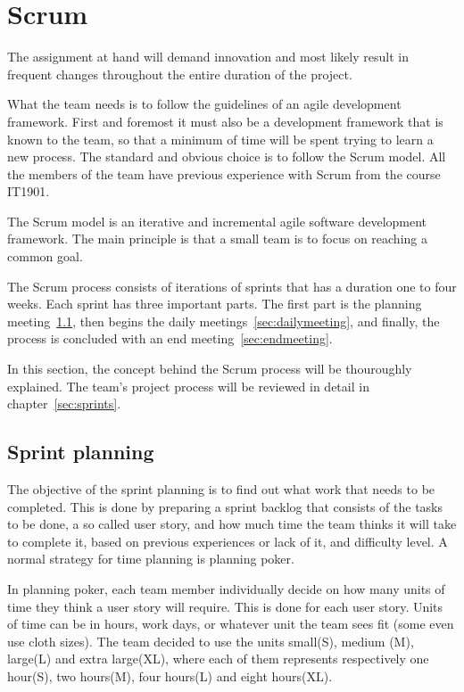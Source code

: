 \section{Scrum}

The assignment at hand will demand innovation and most likely result in frequent changes throughout the entire duration of the project.

What the team needs is to follow the guidelines of an agile development framework. First and foremost it must also be a development framework that is known to the team, so that a minimum of time will be spent trying to learn a new process. The standard and obvious choice is to follow the Scrum model. All the members of the team have previous experience with Scrum from the course IT1901.

The Scrum model is an iterative and incremental agile software development framework. The main principle is that a small team is to focus on reaching a common goal.

The Scrum process consists of iterations of sprints that has a duration one to four weeks. Each sprint has three important parts.
The first part is the planning meeting~\ref{sec:sprintplanning}, then begins the daily  meetings~\ref{sec:dailymeeting}, and finally, the process is concluded with an end meeting~\ref{sec:endmeeting}.

In this section, the concept behind the Scrum process will be thouroughly explained. The team's project process will be reviewed in detail in chapter~\ref{sec:sprints}.

\subsection{Sprint planning}
\label{sec:sprintplanning}
The objective of the sprint planning is to find out what work that needs to be completed. This is done by preparing a sprint backlog that consists of the tasks to be done, a so called user story, and how much time the team thinks it will take to complete it, based on previous experiences or lack of it, and difficulty level. A normal strategy for time planning is planning poker.

In planning poker, each team member individually decide on how many units of time they think a user story will require. This is done for each user story. 
Units of time can be in hours, work days, or whatever unit the team sees fit (some even use cloth sizes). The team decided to use the units small(S), medium (M), large(L) and extra large(XL), where each of them represents respectively one hour(S), two hours(M), four hours(L) and eight hours(XL).


